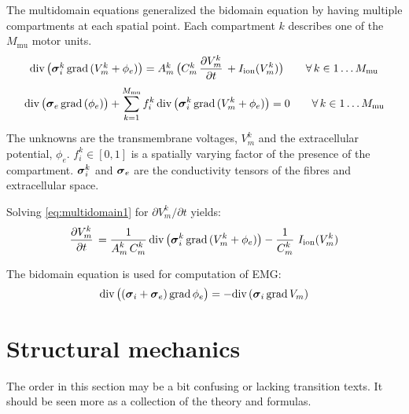 The multidomain equations generalized the bidomain equation by having multiple compartments at each spatial point. Each compartment $k$ describes one of the $M_\text{mu}$ motor units.
\begin{equation}
  \begin{array}{lll}\label{eq:multidomain1}
    \div\big(\bfsigma_i^k\,\grad(V_m^k + \phi_e)\big) = A_m^k\,\big(C_m^k\,\p{V_m^k}{t} + I_\text{ion}(V_m^k)\big) \qquad \forall\,k \in 1\dots M_\text{mu}
  \end{array}
\end{equation}
\begin{equation}\label{eq:multidomain2}
  \begin{array}{lll}
    \hbox{div} \,\big(\boldsymbol{\sigma}_e\,\hbox{grad} \,(\phi_e)\big) + \displaystyle\sum\limits_{k=1}^{M_\text{mu}} f_i^k\,\hbox{div} \,\big(\boldsymbol{\sigma}_i^k\,\hbox{grad} \,(V_m^k + \phi_e)\big) = 0 \qquad\forall\,k \in 1\dots M_\text{mu}\\[4mm]
  \end{array}
\end{equation}
The unknowns are the transmembrane voltages, $V_m^k$ and the extracellular potential, $\phi_e$. $f_i^k \in [0,1]$ is a spatially varying factor of the presence of the compartment.
$\boldsymbol{\sigma}_i^k$ and $\boldsymbol{\sigma}_e$ are the conductivity tensors of the fibres and extracellular space.

Solving \eqref{eq:multidomain1} for $∂V_m^k/∂t$ yields:
\begin{equation*}
  \begin{array}{lll}
    \p{V_m^k}{t} = \dfrac{1}{A^k_m\,C_m^k}\div\big(\bfsigma_i^k\,\grad(V_m^k + \phi_e)\big) - \dfrac{1}{C_m^k}\,I_\text{ion}(V_m^k)
  \end{array}
\end{equation*}

The bidomain equation is used for computation of EMG:
\begin{equation*}
  \begin{array}{lll}
    \hbox{div} \,\big((\boldsymbol{\sigma}_i + \boldsymbol{\sigma}_e)\,\hbox{grad} \, \phi_e\big) = - \hbox{div} \,(\boldsymbol{\sigma}_i\,\hbox{grad} \, V_m)
  \end{array}
\end{equation*}

\section{Structural mechanics}
The order in this section may be a bit confusing or lacking transition texts. It should be seen more as a collection of the theory and formulas.

